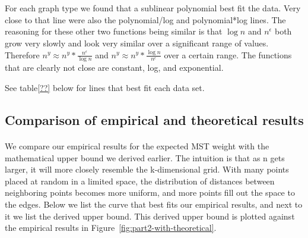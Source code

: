 \begin{figure*}[htb!]
\centering
\mbox{
\quad
{}
}
\mbox{
\quad
{}
}
\label{fig:part2-fit}
\end{figure*}

\paragraph{}
For each graph type we found that a sublinear polynomial best fit
the data. Very close to that line were also the polynomial/log and
polynomial*log lines. The reasoning for these other two functions being
similar is that $\log n$ and $n^\epsilon$ both grow very slowly and look
very similar over a significant range of values. Therefore $n^y \approx
n^y * \frac{n^\epsilon}{\log n}$ and $n^y \approx n^y * \frac{\log
  n}{n^\epsilon}$ over a certain range. The functions that are clearly not
close are constant, log, and exponential.

See table\ref{??} below for lines that best fit each data set.


\subsection{Comparison of empirical and theoretical results}
\paragraph{}
We compare our empirical results for the expected MST weight with the
mathematical upper bound we derived earlier. The intuition is that as n
gets larger, it will more closely resemble the k-dimensional grid. With
many points placed at random in a limited space, the distribution of
distances between neighboring points becomes more uniform, and more points
fill out the space to the edges. Below we
list the curve that best fits our empirical results, and next to it we
list the derived upper bound.  This derived upper bound is plotted against the
empirical results in Figure~\ref{fig:part2-with-theoretical}.

